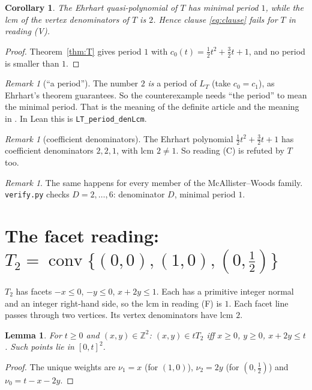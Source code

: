 \documentclass[11pt]{article}
\newtheorem{lemma}[theorem]{Lemma}
\newtheorem{corollary}[theorem]{Corollary}
\theoremstyle{definition}
\theoremstyle{remark}
\newtheorem{remark}[theorem]{Remark}
\newcommand{\Z}{\mathbb Z}
\newcommand{\conv}{\operatorname{conv}}
\begin{document}
\begin{corollary}\label{cor:T}
The Ehrhart quasi-polynomial of $T$ has minimal period $1$, while the lcm of the vertex
denominators of $T$ is $2$. Hence clause \eqref{eq:clause} fails for $T$ in reading (V).
\end{corollary}

\begin{proof}
Theorem~\ref{thm:T} gives period $1$ with $c_0(t)=\frac12t^2+\frac32t+1$, and no period is smaller
than $1$.
\end{proof}

\begin{remark}[``a period'']\label{rem:aperiod}
The number $2$ \emph{is} a period of $L_T$ (take $c_0=c_1$), as Ehrhart's theorem guarantees. So
the counterexample needs ``the period'' to mean the minimal period. That is the meaning of the
definite article and the meaning in \cite{MW}. In Lean this is \texttt{LT\_period\_denLcm}.
\end{remark}

\begin{remark}[coefficient denominators]\label{rem:coef}
The Ehrhart polynomial $\frac12t^2+\frac32t+1$ has coefficient denominators $2,2,1$, with lcm $2\ne1$. So
reading (C) is refuted by $T$ too.
\end{remark}

\begin{remark}
The same happens for every member of the McAllister--Woods family. \texttt{verify.py} checks
$D=2,\dots,6$: denominator $D$, minimal period $1$.
\end{remark}

\section{\texorpdfstring{The facet reading: $T_2=\conv\{(0,0),(1,0),(0,\frac12)\}$}{The facet reading: T2}}
\label{sec:facet}

$T_2$ has facets $-x\le0$, $-y\le0$, $x+2y\le1$. Each has a primitive integer normal and an integer
right-hand side, so the lcm in reading (F) is $1$. Each facet line passes through two vertices. Its vertex
denominators have lcm $2$.

\begin{lemma}\label{lem:HT2}
For $t\ge0$ and $(x,y)\in\Z^2$: $(x,y)\in tT_2$ iff $x\ge0$, $y\ge0$, $x+2y\le t$. Such points
lie in $[0,t]^2$.
\end{lemma}
\begin{proof}
The unique weights are $\nu_1=x$ (for $(1,0)$), $\nu_2=2y$ (for $(0,\frac12)$) and
$\nu_0=t-x-2y$.
\end{proof}
\end{document}
